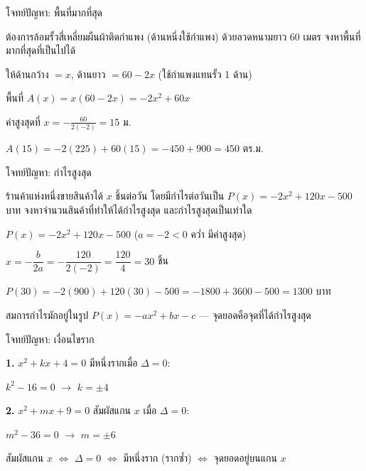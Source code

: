 \documentclass[11pt, aspectratio=169]{beamer}
\begin{document}
\begin{frame}{โจทย์ปัญหา: พื้นที่มากที่สุด}
  \begin{exambox}[โจทย์]
    ต้องการล้อมรั้วสี่เหลี่ยมผืนผ้าติดกำแพง (ด้านหนึ่งใช้กำแพง) ด้วยลวดหนามยาว 60 เมตร
    จงหาพื้นที่มากที่สุดที่เป็นไปได้
  \end{exambox}

  \begin{solbox}[วิธีทำ]
    ให้ด้านกว้าง $= x$, ด้านยาว $= 60 - 2x$ \quad (ใช้กำแพงแทนรั้ว 1 ด้าน)

    พื้นที่ $A(x) = x(60-2x) = -2x^2 + 60x$

    ค่าสูงสุดที่ $x = -\frac{60}{2(-2)} = 15$ ม.

    $A(15) = -2(225) + 60(15) = -450 + 900 = 450$ ตร.ม.

  \end{solbox}
\end{frame}

\begin{frame}{โจทย์ปัญหา: กำไรสูงสุด}
  \begin{exambox}[โจทย์]
    ร้านค้าแห่งหนึ่งขายสินค้าได้ $x$ ชิ้นต่อวัน โดยมีกำไรต่อวันเป็น
    $P(x) = -2x^2 + 120x - 500$ บาท
    จงหาจำนวนสินค้าที่ทำให้ได้กำไรสูงสุด และกำไรสูงสุดเป็นเท่าใด
  \end{exambox}

  \begin{solbox}[วิธีทำ]
    $P(x) = -2x^2 + 120x - 500$ \quad ($a = -2 < 0$ ควํ่า มีค่าสูงสุด)

    $x = -\dfrac{b}{2a} = -\dfrac{120}{2(-2)} = \dfrac{120}{4} = 30$ ชิ้น

    $P(30) = -2(900) + 120(30) - 500 = -1800 + 3600 - 500 = 1300$ บาท

  \end{solbox}

  \begin{intuition}
    สมการกำไรมักอยู่ในรูป $P(x) = -ax^2 + bx - c$
    — จุดยอดคือจุดที่ได้กำไรสูงสุด
  \end{intuition}
\end{frame}

\begin{frame}{โจทย์ปัญหา: เงื่อนไขราก}
  \begin{exambox}[ตัวอย่าง]
    \textbf{1.} $x^2 + kx + 4 = 0$ มีหนึ่งรากเมื่อ $\Delta = 0$:

    $k^2 - 16 = 0$ \quad $\rightarrow$ \quad $k = \pm 4$

    \medskip
    \textbf{2.} $x^2 + mx + 9 = 0$ สัมผัสแกน $x$ เมื่อ $\Delta = 0$:

    $m^2 - 36 = 0$ \quad $\rightarrow$ \quad $m = \pm 6$
  \end{exambox}

  \begin{intuition}[สรุป]
    สัมผัสแกน $x$ $\iff$ $\Delta = 0$ $\iff$ มีหนึ่งราก (รากซํ้า) $\iff$ จุดยอดอยู่บนแกน $x$
  \end{intuition}
\end{frame}
\end{document}
